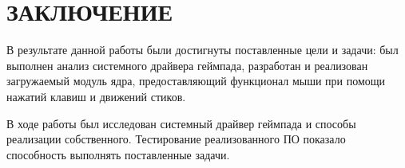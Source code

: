 \section*{ЗАКЛЮЧЕНИЕ}
В результате данной работы были достигнуты поставленные цели и
задачи: был выполнен анализ системного драйвера геймпада, разработан и
реализован загружаемый модуль ядра, предоставляющий функционал мыши при помощи нажатий клавиш
и движений стиков.\par
В ходе работы был исследован системный драйвер геймпада и способы
реализации собственного. Тестирование реализованного
ПО показало способность выполнять поставленные задачи.


\pagebreak